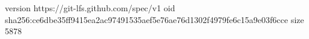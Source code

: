 version https://git-lfs.github.com/spec/v1
oid sha256:ce6dbe35ff9415ea2ac97491535aef5e76ae76d1302f4979fe6c15a9e03f6cce
size 5878
